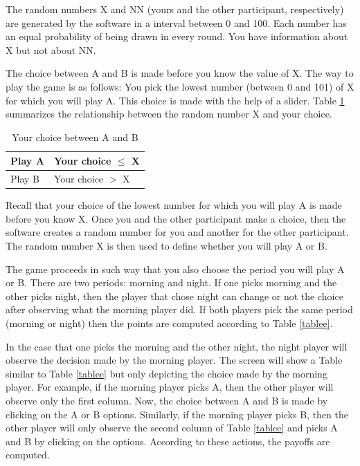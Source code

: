 \documentclass[12pt, letterpaper]{article}
\theoremstyle{plain}
\begin{document}
The random numbers X and NN (yours and the other participant, respectively) are generated by the software in a interval between 0 and 100. Each number has an equal probability of being drawn in every round. You have information about X but not about NN. 

The choice between A and B is made before you know the value of X. The way to play the game is as follows: You pick the lowest number (between 0 and 101) of X for which you will play A. This choice is made with the help of a slider. Table \ref{tableef} summarizes the relationship between the random number X and your choice. 

\begin{table}[!ht]
\centering
\begin{tabular}{l|l}
Play A & Your choice $\leq$ X \\
\hline
Play B & Your choice $>$  X  \\
\end{tabular}
\caption{Your choice between A and B}
\label{tableef}
\end{table}

Recall that your choice of the lowest number for which you will play A is made before you know X. Once you and the other participant make a choice, then the software creates a random number for you and another for the other participant. The random number X is then used to define whether you will play A or B. 

The game proceeds in such way that you also choose the period you will play A or B. There are two periods: morning and night. If one picks morning and the other picks night, then the player that chose night can change or not the choice after observing what the morning player did. If both players pick the same period (morning or night) then the points are computed according to Table \ref{tablee}. 

In the case that one picks the morning and the other night, the night player will observe the decision made by the morning player. The screen will show a Table similar to Table \ref{tablee} but only depicting the choice made by the morning player. For example, if the morning player picks A, then the other player will observe only the first column. Now, the choice between A and B is made by clicking on the A or B options. Similarly, if the morning player picks B, then the other player will only observe the second column of Table \ref{tablee} and picks A and B by clicking on the options. According to these actions, the payoffs are computed. 
\end{document}
